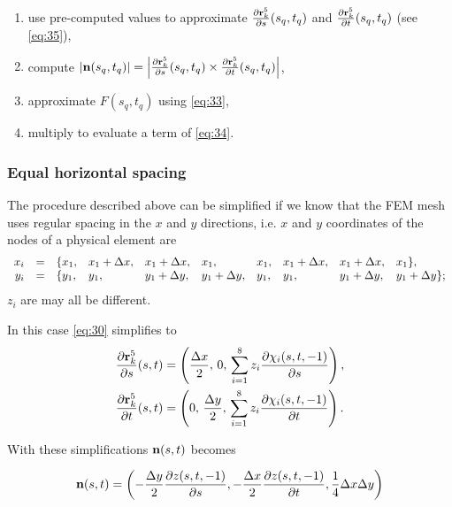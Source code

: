 \documentclass[11pt]{article}
\begin{document}
\begin{enumerate}
\item use pre-computed values to approximate $\frac{\partial \mathbf{r}_{k}^{5}}{\partial s}(s_{q},t_{q})$ and
$\frac{\partial \mathbf{r}_{k}^{5}}{\partial t}(s_{q},t_{q})$ (see \eqref{eq:35}),
\item compute $|\mathbf{n}(s_{q}, t_{q})| = \left| \frac{\partial \mathbf{r}_{k}^{5}}{\partial s}(s_{q}, t_{q}) \times \frac{\partial \mathbf{r}_{k}^{5}}{\partial t}(s_{q}, t_{q}) \right|$,
\item approximate $F(s_{q}, t_{q})$ using \eqref{eq:33},
\item multiply to evaluate a term of \eqref{eq:34}.
\end{enumerate}

\subsubsection{Equal horizontal spacing}
\label{sec-4-1-1}

The procedure described above can be simplified if we know that the
FEM mesh uses regular spacing in the $x$ and $y$ directions, i.e.
$x$ and $y$ coordinates of the nodes of a physical element are
\begin{equation}
  \label{eq:36}
  \begin{array}{rcllllllll}
    x_{i} &=& \{ x_{1}, &x_{1} + \Delta x, &x_{1} + \Delta x, &x_{1}, &x_{1}, &x_{1} + \Delta x, &x_{1} + \Delta x, &x_{1} \},\\
    y_{i} &=& \{ y_{1}, &y_{1}, &y_{1} + \Delta y, &y_{1} + \Delta y, &y_{1}, &y_{1}, &y_{1} + \Delta y, &y_{1} + \Delta y \};\\
  \end{array}
\end{equation}
$z_{i}$ are may all be different.

In this case \eqref{eq:30} simplifies to
\begin{align}
  \label{eq:37}
  \frac{\partial \mathbf{r}_{k}^{5}}{\partial s}(s,t) &= \left(
             \frac{\Delta x}{2},\,
             0,\,
             \sum_{i=1}^{8} z_{i} \frac{\partial \chi_{i}(s, t, -1)}{\partial s} \right),\\
  \frac{\partial \mathbf{r}_{k}^{5}}{\partial t}(s,t) &= \left(
             0,\,
             \frac{\Delta y}{2},\,
             \sum_{i=1}^{8} z_{i} \frac{\partial \chi_{i}(s, t, -1)}{\partial t} \right).
\end{align}

With these simplifications $\mathbf{n}(s,t)$ becomes

\begin{equation}
  \label{eq:38}
  \mathbf{n}(s,t) = \left(
    -\frac{\Delta y}{2}\frac{\partial z(s,t,-1)}{\partial s},
    -\frac{\Delta x}{2}\frac{\partial z(s,t,-1)}{\partial t},
    \frac{1}{4} \Delta x \Delta y
  \right)
\end{equation}
\end{document}
